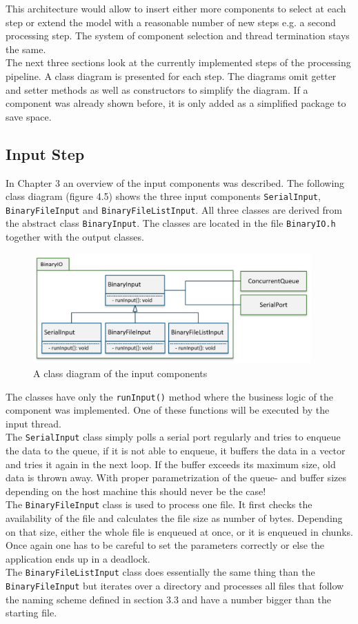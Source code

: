 This architecture would allow to insert either more components to select at each step or extend the model with a reasonable number of new steps e.g. a second processing step. The system of component selection and thread termination stays the same.\\
The next three sections look at the currently implemented steps of the processing pipeline. A class diagram is presented for each step. The diagrams omit getter and setter methods as well as constructors to simplify the diagram. If a component was already shown before, it is only added as a simplified package to save space.
\subsection{Input Step}
In Chapter 3 an overview of the input components was described. The following class diagram (figure 4.5) shows the three input components \texttt{SerialInput}, \texttt{BinaryFileInput} and \texttt{BinaryFileListInput}. All three classes are derived from the abstract class \texttt{BinaryInput}. The classes are located in the file \texttt{BinaryIO.h} together with the output classes.

\begin{figure}[h]
\centering
      \includegraphics[width=0.95\textwidth]{input}
        \caption{A class diagram of the input components}
\end{figure}

The classes have only the \texttt{runInput()} method where the business logic of the component was implemented. One of these functions will be executed by the input thread. \\ The \texttt{SerialInput} class simply polls a serial port regularly and tries to enqueue the data to the queue, if it is not able to enqueue, it buffers the data in a vector and tries it again in the next loop. If the buffer exceeds its maximum size, old data is thrown away. With proper parametrization of the queue- and buffer sizes depending on the host machine this should never be the case!\\
The \texttt{BinaryFileInput} class is used to process one file. It first checks the availability of the file and calculates the file size as number of bytes. Depending on that size, either the whole file is enqueued at once, or it is enqueued in chunks. Once again one has to be careful to set the parameters correctly or else the application ends up  in a deadlock.\\
The \texttt{BinaryFileListInput} class does essentially the same thing than the \texttt{BinaryFileInput} but iterates over a directory and processes all files that follow the naming scheme defined in section 3.3 and have a number bigger than the starting file.
